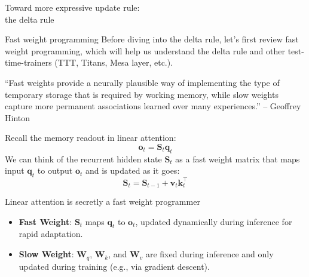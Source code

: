 

\begin{frame}{}
    \centering
    \LARGE
    Toward more expressive update rule: \\the delta rule
\end{frame}

\begin{frame}{Fast weight programming}
    Before diving into the delta rule, let's first review fast weight programming, 
    which will help us understand the delta rule and other test-time-trainers 
    (TTT, Titans, Mesa layer, etc.). 
\begin{tcolorbox}[colback=blue!5,colframe=blue!40,boxrule=0.5pt]
    ``Fast weights provide a neurally plausible way of implementing the type of temporary storage that is required by working memory, while slow weights capture more permanent associations learned over many experiences.''
    \small{ -- Geoffrey Hinton}
\end{tcolorbox}




\vspace{5mm}

Recall the memory readout in linear attention:
\[
    \mathbf{o}_t = \mathbf{S}_t \mathbf{q}_t
\]
We can think of the recurrent hidden state $\mathbf{S}_t$ as a fast weight matrix that maps input $\mathbf{q}_t$ to output $\mathbf{o}_t$ and is updated as it goes:
\[\mathbf{S}_t = \mathbf{S}_{t-1} + \mathbf{v}_t\mathbf{k}_t^\top\]



\end{frame}



\begin{frame}{Linear attention is secretly a fast weight programmer}
    
        
\vspace{-4mm}
\begin{itemize}
    \item {\color{red}\textbf{Fast Weight}}: $\mathbf{S}_t$ maps $\mathbf{q}_t$ to $\mathbf{o}_t$, updated dynamically during inference  for rapid adaptation.
    \item {\color{red}\textbf{Slow Weight}}: $\mathbf{W}_q$, $\mathbf{W}_k$, and $\mathbf{W}_v$ are fixed during inference and only updated during training (e.g., via gradient descent).
\end{itemize}



\end{frame}

